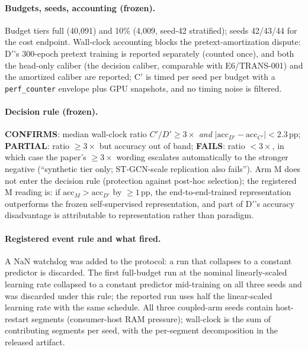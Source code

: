 \documentclass[11pt,a4paper]{article}
\begin{document}
\paragraph{Budgets, seeds, accounting (frozen).}
Budget tiers full (40{,}091) and 10\% (4{,}009, seed-42 stratified); seeds 42/43/44 for the cost endpoint. Wall-clock accounting blocks the pretext-amortization dispute: D$'$'s 300-epoch pretext training is reported separately (counted once), and both the head-only caliber (the decision caliber, comparable with E6/TRANS-001) and the amortized caliber are reported; C$'$ is timed per seed per budget with a \texttt{perf\_counter} envelope plus GPU snapshots, and no timing noise is filtered.

\paragraph{Decision rule (frozen).}
\textbf{CONFIRMS}: median wall-clock ratio $C'/D' \geq 3\times$ \emph{and} $|\mathrm{acc}_{D'} - \mathrm{acc}_{C'}| < 2.3$\,pp; \textbf{PARTIAL}: ratio $\geq 3\times$ but accuracy out of band; \textbf{FAILS}: ratio $< 3\times$, in which case the paper's $\geq 3\times$ wording escalates automatically to the stronger negative (``synthetic tier only; ST-GCN-scale replication also fails''). Arm M does not enter the decision rule (protection against post-hoc selection); the registered M reading is: if $\mathrm{acc}_M > \mathrm{acc}_{D'}$ by $\geq 1$\,pp, the end-to-end-trained representation outperforms the frozen self-supervised representation, and part of D$'$'s accuracy disadvantage is attributable to representation rather than paradigm.

\paragraph{Registered event rule and what fired.}
A NaN watchdog was added to the protocol: a run that collapses to a constant predictor is discarded. The first full-budget run at the nominal linearly-scaled learning rate collapsed to a constant predictor mid-training on all three seeds and was discarded under this rule; the reported run uses half the linear-scaled learning rate with the same schedule. All three coupled-arm seeds contain host-restart segments (consumer-host RAM pressure); wall-clock is the sum of contributing segments per seed, with the per-segment decomposition in the released artifact.
\end{document}
